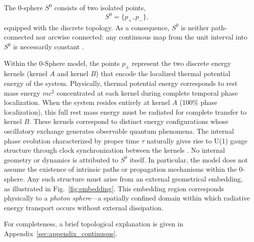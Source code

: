 \documentclass[%
 reprint,
 amsmath,amssymb,
 aps,
 prb,
]{revtex4-2}
\numberwithin{equation}{section}
\begin{document}
The 0-sphere $S^{0}$ consists of two isolated points,
\begin{equation}
S^{0} = \{p_{+}, p_{-}\},
\end{equation}
equipped with the discrete topology.
As a consequence, $S^{0}$ is neither path-connected nor arcwise connected: any continuous map from the unit interval into $S^{0}$ is necessarily constant \cite{Munkres2000}.

Within the 0-Sphere model, the points $p_{\pm}$ represent the two discrete energy kernels (kernel $A$ and kernel $B$) that encode the localized thermal potential energy of the system.
Physically, thermal potential energy corresponds to rest mass energy $mc^2$ concentrated at each kernel during complete temporal phase localization.
When the system resides entirely at kernel $A$ (100\% phase localization), this full rest mass energy must be radiated for complete transfer to kernel $B$.
These kernels correspond to distinct energy configurations whose oscillatory exchange generates observable quantum phenomena.
The internal phase evolution characterized by proper time $\tau$ naturally gives rise to U(1) gauge structure through clock synchronization between the kernels \cite{hanamura17765136}.
No internal geometry or dynamics is attributed to $S^{0}$ itself.
In particular, the model does not assume the existence of intrinsic paths or propagation mechanisms within the 0-sphere.
Any such structure must arise from an external geometrical embedding, as illustrated in Fig.~\ref{fig:embedding}.
This embedding region corresponds physically to a \textit{photon sphere}—a spatially confined domain within which radiative energy transport occurs without external dissipation.

For completeness, a brief topological explanation is given in Appendix~\ref{sec:appendix_continuous}.
\end{document}
